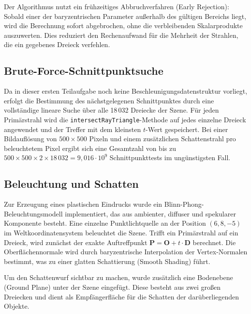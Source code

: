 \documentclass[11pt, a4paper]{article}
\begin{document}
Der Algorithmus nutzt ein frühzeitiges Abbruchverfahren (Early Rejection): Sobald einer der baryzentrischen Parameter außerhalb des gültigen Bereichs liegt, wird die Berechnung sofort abgebrochen, ohne die verbleibenden Skalarprodukte auszuwerten. Dies reduziert den Rechenaufwand für die Mehrheit der Strahlen, die ein gegebenes Dreieck verfehlen.

\subsection{Brute-Force-Schnittpunktsuche}

Da in dieser ersten Teilaufgabe noch keine Beschleunigungsdatenstruktur vorliegt, erfolgt die Bestimmung des nächstgelegenen Schnittpunktes durch eine vollständige lineare Suche über alle 18\,032 Dreiecke der Szene. Für jeden Primärstrahl wird die \texttt{intersectRayTriangle}-Methode auf jedes einzelne Dreieck angewendet und der Treffer mit dem kleinsten $t$-Wert gespeichert. Bei einer Bildauflösung von $500 \times 500$ Pixeln und einem zusätzlichen Schattenstrahl pro beleuchtetem Pixel ergibt sich eine Gesamtzahl von bis zu $500 \times 500 \times 2 \times 18\,032 = 9{,}016 \cdot 10^9$ Schnittpunkttests im ungünstigsten Fall.

\subsection{Beleuchtung und Schatten}

Zur Erzeugung eines plastischen Eindrucks wurde ein Blinn-Phong-Beleuchtungsmodell implementiert, das aus ambienter, diffuser und spekularer Komponente besteht. Eine einzelne Punktlichtquelle an der Position $(6, 8, -5)$ im Weltkoordinatensystem beleuchtet die Szene. Trifft ein Primärstrahl auf ein Dreieck, wird zunächst der exakte Auftreffpunkt $\mathbf{P} = \mathbf{O} + t \cdot \mathbf{D}$ berechnet. Die Oberflächennormale wird durch baryzentrische Interpolation der Vertex-Normalen bestimmt, was zu einer glatten Schattierung (Smooth Shading) führt.

Um den Schattenwurf sichtbar zu machen, wurde zusätzlich eine Bodenebene (Ground Plane) unter der Szene eingefügt. Diese besteht aus zwei großen Dreiecken und dient als Empfängerfläche für die Schatten der darüberliegenden Objekte.
\end{document}
